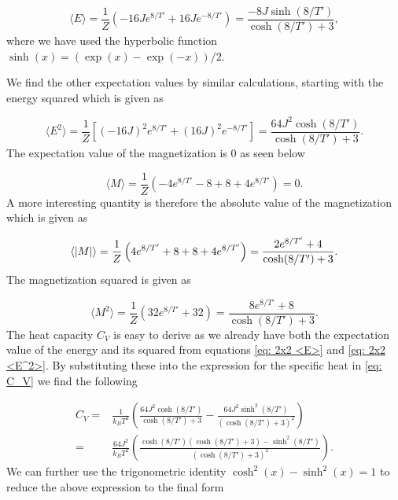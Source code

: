 \documentclass[a4paper, 10pt, reqno]{amsart}
\begin{document}
\begin{equation}\label{eq: 2x2 <E>}
    \langle E \rangle = \frac{1}{Z} \left(-16J e^{8/T'} + 16J e^{-8/T'}\right) = \frac{-8J \sinh(8/T')}{\cosh(8/T') + 3},
\end{equation}
where we have used the hyperbolic function $\sinh(x) = (\exp(x) -
\exp(-x))/2$.

We find the other expectation values by similar calculations, starting with
the energy squared which is given as

\begin{equation}\label{eq: 2x2 <E^2>}
    \langle E^2 \rangle = \frac{1}{Z}\left[ (-16J)^2 e^{8/T'} + (16J)^2 e^{-8/T'}\right]= \frac{64 J^2 \cosh (8/T')}{\cosh(8/T') + 3}.
\end{equation}
The expectation value of the magnetization is 0 as seen below

\begin{equation}\label{eq: 2x2 <M>}
    \langle M \rangle = \frac{1}{Z} \left(-4e^{8/T'} - 8 + 8 + 4e^{8/T'}\right) = 0.
\end{equation}
A more interesting quantity is therefore the absolute value of the magnetization which is given as

\begin{equation}\label{eq: 2x2 <absM>}
    \langle \abs{M} \rangle = \frac{1}{Z} \left(4e^{8/T'} + 8 + 8 + 4e^{8/T'}\right) = \frac{2e^{8/T'} + 4}{\cosh(8/T') +3}.
\end{equation}
The magnetization squared is given as

\begin{equation}\label{eq: 2x2 M^2}
    \langle {M}^2 \rangle = \frac{1}{Z}\left( 32e^{8/T'} +32 \right) = \frac{8e^{8/T'} + 8}{\cosh(8/T') +3}.
\end{equation}
The heat capacity $C_V$ is easy to derive as we already have both the
expectation value of the energy and its squared from equations \eqref{eq: 2x2
<E>} and \eqref{eq: 2x2 <E^2>}. By substituting these into the expression for the specific heat in \eqref{eq: C_V} we find the following 

\begin{align}
    C_V =& \frac{1}{k_B T^2} \left( \frac{64J^2 \cosh(8/T')}{\cosh(8/T') +3} -
    \frac{64J^2 \sinh^2(8/T')}{(\cosh(8/T') + 3)^2}  \right) \\
    =&\frac{64J^2}{k_B T^2} \left( \frac{\cosh(8/T')(\cosh(8/T') + 3) -
    \sinh^2(8/T')}{(\cosh(8/T') + 3)^2} \right).
\end{align}
We can further use the trigonometric identity $\cosh^2(x) - \sinh^2(x) = 1$ to reduce the above expression to the final form
\end{document}
